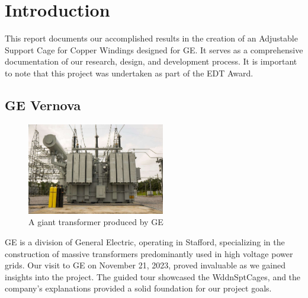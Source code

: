 \documentclass[a4paper,10pt]{article}
\begin{document}

\section{Introduction}
This report documents our accomplished results in the creation of an Adjustable Support Cage for Copper Windings designed for \gls{GE}. It serves as a comprehensive documentation of our research, design, and development process. It is important to note that this project was undertaken as part of the \gls{EDT} Award.

\subsection{GE Vernova}
\begin{figure}[H]
  \centering
  \includegraphics[width=6cm]{giant-transformer}
  \caption{A giant transformer produced by \gls{GE}}
  \label{fig:giant-transformer}
\end{figure}

\gls{GE} is a division of General Electric, operating in Stafford, specializing in the construction of massive transformers predominantly used in high voltage power grids. Our visit to \gls{GE} on November 21, 2023, proved invaluable as we gained insights into the project. The guided tour showcased the \gls{WddnSptCages}, and the company's explanations provided a solid foundation for our project goals.
\end{document}
